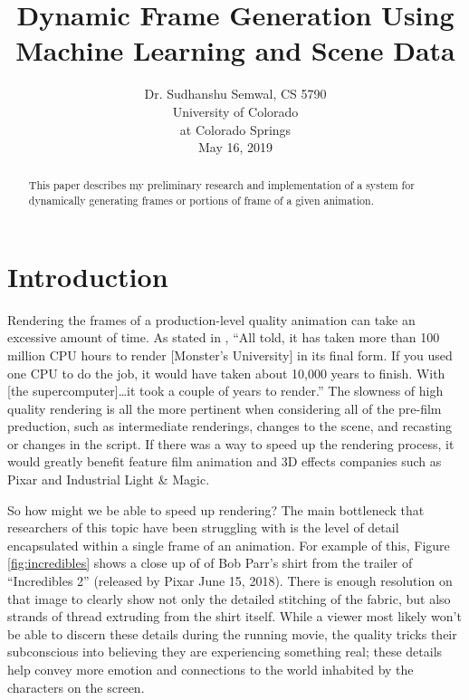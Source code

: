 \documentclass[conference]{IEEEtran}
\begin{document}
\title{Dynamic Frame Generation Using Machine Learning
and Scene Data
}

\author{
Dr. Sudhanshu Semwal, CS 5790\\
University of Colorado\\
at Colorado Springs\\
May 16, 2019}

\maketitle

\begin{abstract}
This paper describes my preliminary research and implementation of a
system for dynamically generating frames or portions of frame
of a given animation.
\end{abstract}

\section{Introduction}
\label{sec:introduction}
Rendering the frames of a production-level quality animation can take an
excessive amount of time. As stated in \cite{ref:monsters}, ``All told, it has
taken more than 100 million CPU hours to render [Monster's University] in its final form. If
you used one CPU to do the job, it would have taken about 10,000 years to
finish. With [the supercomputer]\dots it took a couple of years to
render.'' The slowness of high quality rendering is all the more pertinent when considering all of the
pre-film preduction, such as intermediate renderings, changes to the scene, and
recasting or changes in the script. If there was a way to speed up the rendering
process, it would greatly benefit feature film animation and 3D effects companies such as Pixar
and Industrial Light \& Magic.

So how might we be able to speed up rendering? The main bottleneck that
researchers of this topic have been struggling with is the level of detail
encapsulated within a single frame of an animation. For example of this, Figure
\ref{fig:incredibles} shows a close up of of Bob Parr's shirt from the trailer
of ``Incredibles 2'' (released by Pixar June 15, 2018). There is enough
resolution on that image to clearly show not only the detailed stitching of the
fabric, but also strands of thread extruding from the shirt itself. While a
viewer most likely won't be able to discern these details during the running
movie, the quality tricks their subconscious into believing they are
experiencing something real; these details help convey more emotion and
connections to the world inhabited by the characters on the screen.
\end{document}
